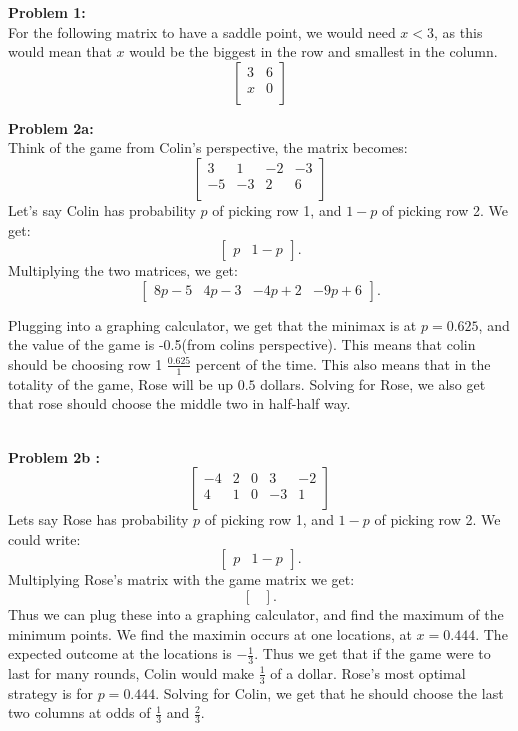 \documentclass[12pt]{article}
\begin{document}
\noindent 
\textbf{Problem 1:} \\
For the following matrix to have a saddle point, we would need $x<3$,
as this would mean that $x$ would be the biggest in the row and smallest in the column.
\[
\begin{bmatrix}
3 & 6 \\
x & 0 \\
\end{bmatrix}
\]

\noindent
\textbf{Problem 2a: }\\

Think of the game from Colin's perspective, the matrix becomes: 
\[
\begin{bmatrix}
3 & 1 & -2 & -3 \\
-5 & -3 & 2 & 6 \\
\end{bmatrix}
\]
Let's say Colin has probability $p$ of picking row 1, and $1-p$ of picking row 2.
We get:
 \[
\begin{bmatrix}
	p & 1-p 	
\end{bmatrix}
.\] 
Multiplying the two matrices, we get:
\[
\begin{bmatrix}
	8p-5 & 4p-3 & -4p+2 & -9p+6
\end{bmatrix}
.\] 

Plugging into a graphing calculator, we get that the minimax is at $p = 0.625$, and the 
value of the game is -0.5(from colins perspective). This means that colin should be choosing row 1 
$\frac{0.625}{1}$ percent of the time. This also means that in the totality of the game, Rose will be up
$0.5$ dollars. Solving for Rose, we also get that rose should choose the middle two in half-half way.

\\

\noindent 
\textbf{Problem 2b :} \\
\[
\begin{bmatrix}
-4 & 2 & 0 & 3 & -2 \\
4 & 1 & 0 & -3 & 1\\
\end{bmatrix}
\]
Lets say Rose has probability $p$ of picking row 1, and $1-p$ of picking row 2. We could write:
 \[
\begin{bmatrix}
	p & 1-p 	
\end{bmatrix}
.\] 
Multiplying Rose's matrix with the game matrix we get: 
\[
\begin{bmatrix}
	
\end{bmatrix}
.\] 
Thus we can plug these into a graphing calculator, and find the maximum of the minimum points. 
We find the maximin occurs at one locations, at $x = 0.444$. The expected outcome 
at the locations is $-\frac{1}{3}$. Thus we get that if the game were to last for many rounds, Colin would make 
$\frac{1}{3}$ of a dollar. Rose's most optimal strategy is for $p = 0.444$. Solving for Colin, we get that 
he should choose the last two columns at odds of $\frac{1}{3}$ and $\frac{2}{3}$. 
\end{document}
